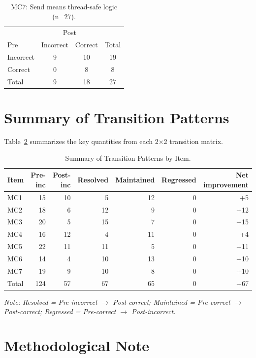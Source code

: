 \documentclass[11pt]{article}
\begin{document}
\begin{table}[h]
\centering
\caption{MC7: Send means thread-safe logic (n=27).}
\label{tab:transition-mc7}
\begin{tabular}{l|cc|c}
\toprule
 & \multicolumn{2}{c|}{Post} & \multicolumn{1}{c}{} \\
Pre & Incorrect & Correct & Total \\
\midrule
Incorrect & 9 & 10 & 19 \\
Correct & 0 & 8 & 8 \\
\midrule
Total & 9 & 18 & 27 \\
\bottomrule
\end{tabular}
\end{table}

\section*{Summary of Transition Patterns}

Table~\ref{tab:transitions-summary} summarizes the key quantities from each 2×2 transition matrix.

\begin{table}[h]
\centering
\caption{Summary of Transition Patterns by Item.}
\label{tab:transitions-summary}
\begin{tabular}{lrrrrrr}
\toprule
Item & Pre-inc & Post-inc & Resolved & Maintained & Regressed & Net improvement \\
\midrule
MC1 & 15 & 10 & 5 & 12 & 0 & +5 \\
MC2 & 18 & 6 & 12 & 9 & 0 & +12 \\
MC3 & 20 & 5 & 15 & 7 & 0 & +15 \\
MC4 & 16 & 12 & 4 & 11 & 0 & +4 \\
MC5 & 22 & 11 & 11 & 5 & 0 & +11 \\
MC6 & 14 & 4 & 10 & 13 & 0 & +10 \\
MC7 & 19 & 9 & 10 & 8 & 0 & +10 \\
\midrule
Total & 124 & 57 & 67 & 65 & 0 & +67 \\
\bottomrule
\end{tabular}
\small
\textit{Note: Resolved = Pre-incorrect $\to$ Post-correct; Maintained = Pre-correct $\to$ Post-correct; Regressed = Pre-correct $\to$ Post-incorrect.}
\end{table}

\section*{Methodological Note}
\end{document}
